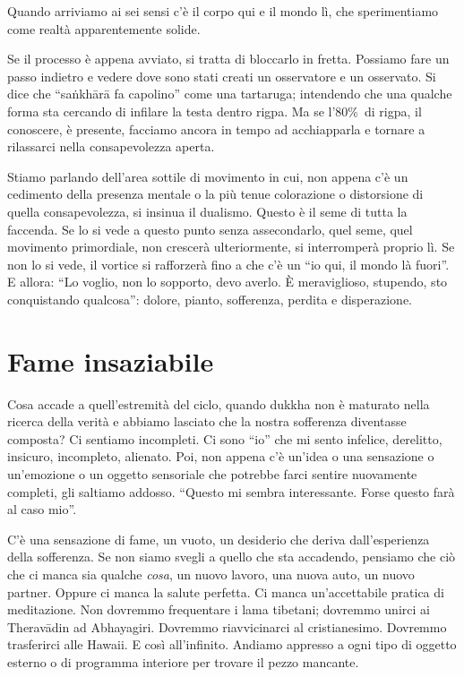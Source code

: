 Quando arriviamo ai sei sensi c'è il corpo qui e il mondo lì, che spe\-ri\-men\-tiamo come realtà apparentemente solide.

Se il processo è appena avviato, si tratta di bloccarlo in fretta. Possiamo fare un passo indietro e vedere dove sono stati creati un osservatore e un osservato. Si dice che ``saṅkhārā fa capolino'' come una tartaruga; intendendo che una qualche forma sta cercando di infilare la testa dentro rigpa. Ma se l'80\%\ di rigpa, il conoscere, è presente, facciamo ancora in tempo ad acchiapparla e tornare a rilassarci nella consapevolezza aperta.

Stiamo parlando dell'area sottile di movimento in cui, non appena c'è un cedimento della presenza mentale o la più tenue colorazione o distorsione di quella consapevolezza, si insinua il dualismo. Questo è il seme di tutta la faccenda. Se lo si vede a questo punto senza assecondarlo, quel seme, quel movimento primordiale, non crescerà ulteriormente, si interromperà proprio lì. Se non lo si vede, il vortice si rafforzerà fino a che c'è un ``io qui, il mondo là fuori''. E allora: ``Lo voglio, non lo sopporto, devo averlo. È meraviglioso, stupendo, sto conquistando qualcosa'': dolore, pianto, sofferenza, perdita e disperazione.

\vspace*{-1.2em}
\section*{Fame insaziabile}

\vspace*{-0.8em}
Cosa accade a quell'estremità del ciclo, quando dukkha non è maturato nella ricerca della verità e abbiamo lasciato che la nostra sofferenza diventasse composta? Ci sentiamo incompleti. Ci sono ``io'' che mi sento infelice, derelitto, insicuro, incompleto, alienato. Poi, non appena c'è un'idea o una sensazione o un'emozione o un oggetto sensoriale che potrebbe farci sentire nuovamente completi, gli saltiamo addosso. ``Questo mi sembra interessante. Forse questo farà al caso mio''.

C'è una sensazione di fame, un vuoto, un desiderio che deriva dall'esperienza della sofferenza. Se non siamo svegli a quello che sta accadendo, pensiamo che ciò che ci manca sia qualche \textit{cosa}, un nuovo lavoro, una nuova auto, un nuovo partner. Oppure ci manca la salute perfetta. Ci manca un'accettabile pratica di meditazione. Non dovremmo frequentare i lama tibetani; dovremmo unirci ai Theravādin ad Abhayagiri. Dovremmo riavvicinarci al cristianesimo. Dovremmo trasferirci alle Hawaii. E così all'infinito. Andiamo appresso a ogni tipo di oggetto esterno o di programma interiore per trovare il pezzo mancante.

